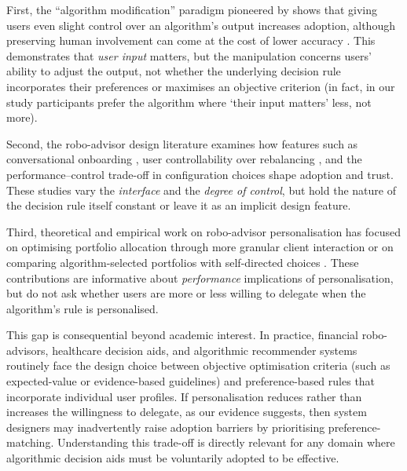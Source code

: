 \documentclass[a4paper, 12pt, fleqn]{article}
\theoremstyle{hypstyle}
\begin{document}
First, the ``algorithm modification'' paradigm pioneered by \citet{Dietvorst2018} shows that giving users even slight control over an algorithm's output increases adoption, although preserving human involvement can come at the cost of lower accuracy \citep{Sele2024}. This demonstrates that \emph{user input} matters, but the manipulation concerns users' ability to adjust the output, not whether the underlying decision rule incorporates their preferences or maximises an objective criterion (in fact, in our study participants prefer the algorithm where `their input matters' less, not more).

Second, the robo-advisor design literature examines how features such as conversational onboarding \citep{Hildebrand2021}, user controllability over rebalancing \citep{Kim2025ICIS}, and the performance--control trade-off in configuration choices \citep{Ruehr2020} shape adoption and trust. These studies vary the \emph{interface} and the \emph{degree of control}, but hold the nature of the decision rule itself constant or leave it as an implicit design feature.

Third, theoretical and empirical work on robo-advisor personalisation has focused on optimising portfolio allocation through more granular client interaction \citep{Capponi2022} or on comparing algorithm-selected portfolios with self-directed choices \citep{BouluReshef2026}. These contributions are informative about \emph{performance} implications of personalisation, but do not ask whether users are more or less willing to delegate when the algorithm's rule is personalised.

This gap is consequential beyond academic interest. In practice, financial robo-advisors, healthcare decision aids, and algorithmic recommender systems routinely face the design choice between objective optimisation criteria (such as expected-value or evidence-based guidelines) and preference-based rules that incorporate individual user profiles. If personalisation reduces rather than increases the willingness to delegate, as our evidence suggests, then system designers may inadvertently raise adoption barriers by prioritising preference-matching. Understanding this trade-off is directly relevant for any domain where algorithmic decision aids must be voluntarily adopted to be effective.
\end{document}
